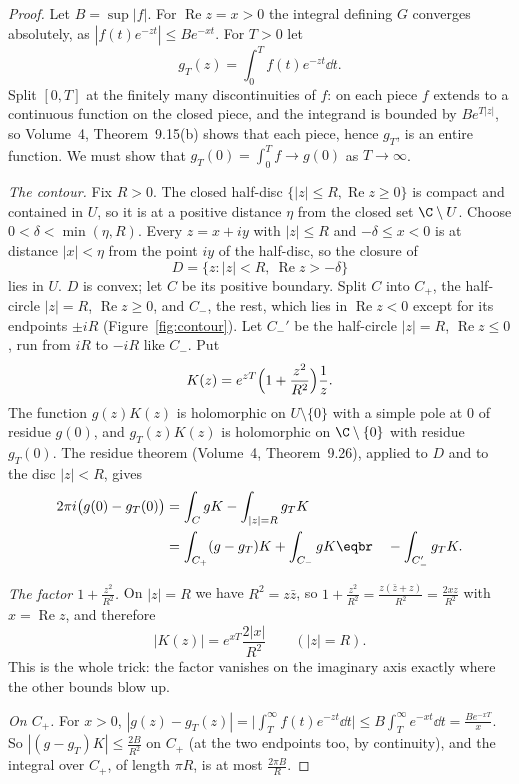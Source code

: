 \begin{proof}
Let $B=\sup|f|$. For $\operatorname{Re}z=x>0$ the integral defining $G$ converges absolutely, as $|f(t)e^{-zt}|\le Be^{-xt}$. For $T>0$ let
\[
g_T(z)=\int_0^Tf(t)e^{-zt}\dd t.
\]
Split $[0,T]$ at the finitely many discontinuities of $f$: on each piece $f$ extends to a continuous function on the closed piece, and the integrand is bounded by
$Be^{T|z|}$, so Volume~4, Theorem~9.15(b) shows that each piece, hence $g_T$, is an entire function. We must show that $g_T(0)=\int_0^Tf\to g(0)$ as $T\to\infty$.

\emph{The contour.} Fix $R>0$. The closed half-disc $\{|z|\le R,\operatorname{Re}z\ge0\}$ is compact and contained in $U$, so it is at a positive distance $\eta$ from the closed set
$\C\setminus U$. Choose $0<\delta<\min(\eta,R)$. Every $z=x+iy$ with $|z|\le R$ and $-\delta\le x<0$ is at distance $|x|<\eta$ from the point $iy$ of the half-disc, so the closure of
\[
D=\{z:|z|<R,\ \operatorname{Re}z>-\delta\}
\]
lies in $U$. $D$ is convex; let $C$ be its positive boundary. Split $C$ into $C_+$, the half-circle $|z|=R$, $\operatorname{Re}z\ge0$, and $C_-$, the rest, which lies in $\operatorname{Re}z<0$
except for its endpoints $\pm iR$ (Figure~\ref{fig:contour}). Let $C_-'$ be the half-circle $|z|=R$, $\operatorname{Re}z\le0$, run from $iR$ to $-iR$ like $C_-$. Put
\[
K(z)=e^{zT}\Bigl(1+\frac{z^2}{R^2}\Bigr)\frac1z.
\]
The function $g(z)K(z)$ is holomorphic on $U\setminus\{0\}$ with a simple pole at $0$ of residue $g(0)$, and $g_T(z)K(z)$ is holomorphic on $\C\setminus\{0\}$ with residue $g_T(0)$. The
residue theorem (Volume~4, Theorem~9.26), applied to $D$ and to the disc $|z|<R$, gives
\[
\begin{aligned}2\pi i\bigl(g(0)-g_T(0)\bigr)&=\int_CgK-\int_{|z|=R}g_TK\\&=\int_{C_+}(g-g_T)K+\int_{C_-}gK\eqbr\quad-\int_{C_-'}g_TK.\end{aligned}
\]

\emph{The factor $1+\frac{z^2}{R^2}$.} On $|z|=R$ we have $R^2=z\bar z$, so $1+\frac{z^2}{R^2}=\frac{z(\bar z+z)}{R^2}=\frac{2xz}{R^2}$ with $x=\operatorname{Re}z$, and therefore
\[
|K(z)|=e^{xT}\frac{2|x|}{R^2}\qquad(|z|=R).
\]
This is the whole trick: the factor vanishes on the imaginary axis exactly where the other bounds blow up.

\emph{On $C_+$.} For $x>0$, $|g(z)-g_T(z)|=\bigl|\int_T^\infty f(t)e^{-zt}\dd t\bigr|\le B\int_T^\infty e^{-xt}\dd t=\frac{Be^{-xT}}x$. So $|(g-g_T)K|\le\frac{2B}{R^2}$ on $C_+$ (at the two endpoints too,
by continuity), and the integral over $C_+$, of length $\pi R$, is at most $\frac{2\pi B}R$.


\end{proof}
